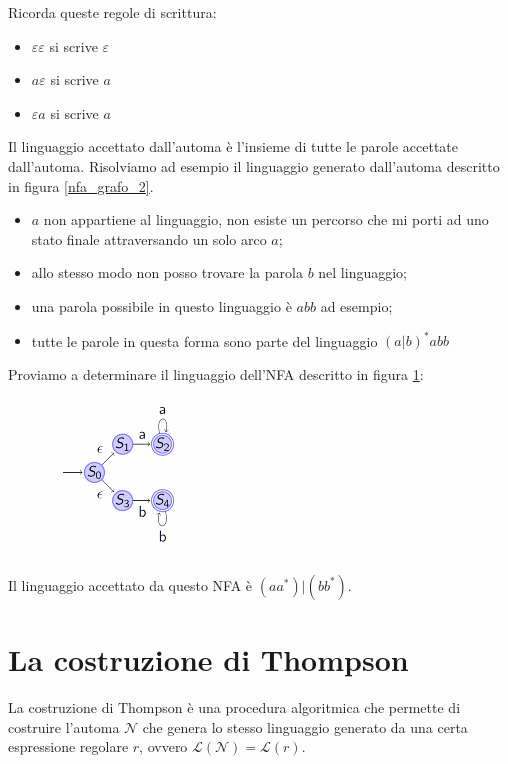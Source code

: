 \documentclass[class=book, crop=false, oneside, 12pt]{standalone}
\begin{document}
Ricorda queste regole di scrittura:
\begin{itemize}
    \item \(\varepsilon \varepsilon\) si scrive \(\varepsilon\)
    \item \(a\varepsilon\) si scrive \(a\)
    \item \(\varepsilon a\) si scrive \(a\)
\end{itemize}
Il linguaggio accettato dall’automa è l’insieme di tutte le parole accettate dall’automa.
Risolviamo ad esempio il linguaggio generato dall’automa descritto in figura \ref{nfa_grafo_2}.
\begin{itemize}
    \item \(a\) non appartiene al linguaggio, non esiste un percorso che mi porti ad uno stato finale attraversando un solo arco \(a\);
    \item allo stesso modo non posso trovare la parola \(b\) nel linguaggio;
    \item una parola possibile in questo linguaggio è \(abb\) ad esempio;
    \item tutte le parole in questa forma sono parte del linguaggio \((a|b)^* abb\)
\end{itemize}

Proviamo a determinare il linguaggio dell'NFA descritto in figura \ref{nfa_grafo_3}:
\begin{figure}
    \centering
    \includegraphics[width=.3\textwidth,keepaspectratio]{nfa_grafo_3}
    \caption{}
    \label{nfa_grafo_3}
\end{figure}
Il linguaggio accettato da questo NFA è \((a a^* ) | ( b b^* )\).

\section{La costruzione di Thompson}
La costruzione di Thompson è una procedura algoritmica che permette di costruire l’automa \(\mathcal{N}\) che genera lo stesso linguaggio generato da una certa espressione regolare \(r\), ovvero \(\mathcal{L}(\mathcal{N}) = \mathcal{L}(r)\).
\end{document}
